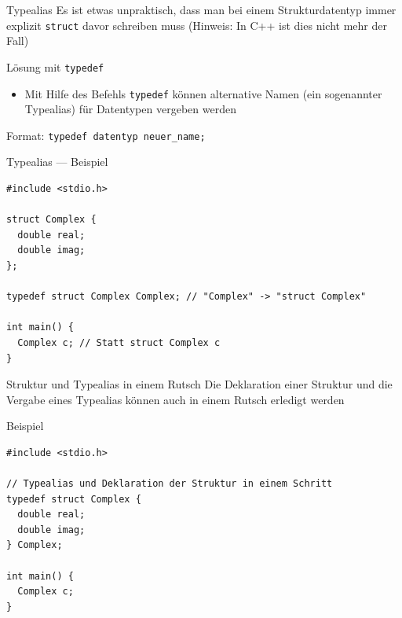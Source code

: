 \documentclass[presentation]{beamer}
\begin{document}
\begin{frame}[label={sec:org759cf5a},fragile]{Typealias}
 Es ist etwas unpraktisch, dass man bei einem Strukturdatentyp immer
explizit {\color{solarizedYellow}\texttt{struct} }davor schreiben muss (Hinweis: In C++ ist dies nicht
mehr der Fall)
\begin{block}{Lösung mit {\color{solarizedYellow}\texttt{typedef}}}
\begin{itemize}
\item Mit Hilfe des Befehls {\color{solarizedYellow}\texttt{typedef} }können alternative Namen (ein
sogenannter Typealias) für Datentypen vergeben werden
\end{itemize}
Format: {\color{solarizedYellow}\texttt{typedef datentyp neuer\_name;}}
\end{block}
\end{frame}
\begin{frame}[label={sec:orgf31a291},fragile]{Typealias --- Beispiel}
 \begin{verbatim}
#include <stdio.h>

struct Complex {
  double real;
  double imag;
};

typedef struct Complex Complex; // "Complex" -> "struct Complex"

int main() {
  Complex c; // Statt struct Complex c
}
\end{verbatim}
\end{frame}
\begin{frame}[label={sec:orge4b647e},fragile]{Struktur und Typealias in einem Rutsch}
 Die Deklaration einer Struktur und die Vergabe eines Typealias können
auch \alert{in einem Rutsch} erledigt werden
\begin{exampleblock}{Beispiel}
\begin{verbatim}
#include <stdio.h>

// Typealias und Deklaration der Struktur in einem Schritt
typedef struct Complex {
  double real;
  double imag;
} Complex;

int main() {
  Complex c;
}
\end{verbatim}
\end{exampleblock}
\end{frame}
\end{document}
